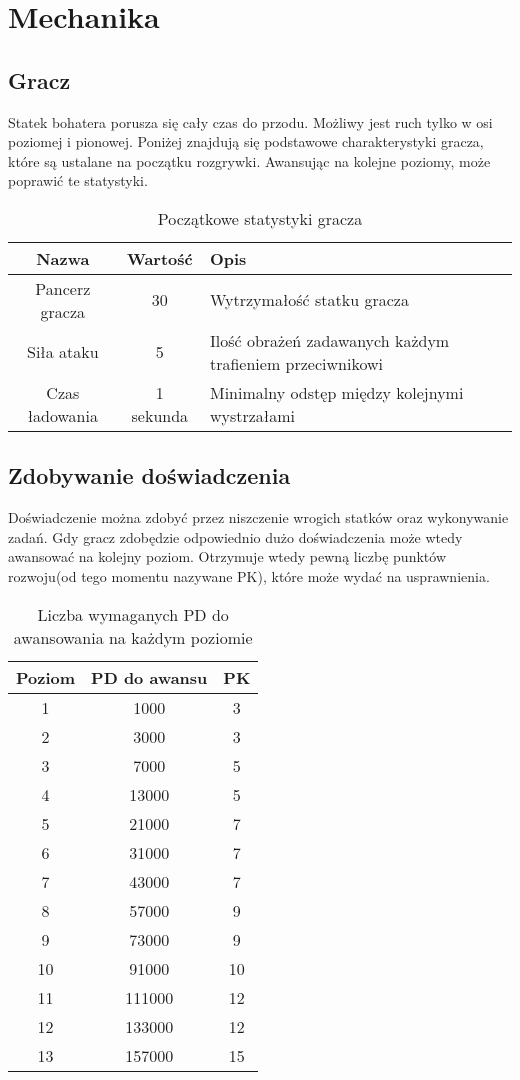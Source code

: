 \chapter{Mechanika}

\section{Gracz}
Statek bohatera porusza się cały czas do przodu. Możliwy jest ruch tylko w osi poziomej i pionowej.
Poniżej znajdują się podstawowe charakterystyki gracza, które są ustalane na początku rozgrywki. Awansując na kolejne poziomy, może poprawić te statystyki.

\begin{table}[h]
\centering
\begin{tabular}{ | c | c | p{6cm} | }
\hline
\textbf{Nazwa} & \textbf{Wartość} & \textbf{Opis} \\ \hline
Pancerz gracza & 30 & Wytrzymałość statku gracza \\ \hline
Siła ataku & 5 & Ilość obrażeń zadawanych każdym trafieniem przeciwnikowi\\ \hline
Czas ładowania & 1 sekunda & Minimalny odstęp między kolejnymi wystrzałami\\ \hline
\end{tabular}
\caption{Początkowe statystyki gracza}
\end{table}

\section{Zdobywanie doświadczenia}
Doświadczenie można zdobyć przez niszczenie wrogich statków oraz wykonywanie zadań. Gdy gracz zdobędzie odpowiednio dużo doświadczenia może wtedy awansować na kolejny poziom. Otrzymuje wtedy pewną liczbę punktów rozwoju(od tego momentu nazywane PK), które może wydać na usprawnienia.

\begin{table}[h]
\centering
\begin{tabular}{ | c | c | c | }
\hline
\textbf{Poziom} & \textbf{PD do awansu} & \textbf{PK} \\
\hline
1 & 1000 & 3 \\
2 & 3000 & 3 \\
3 & 7000 & 5 \\
4 & 13000 & 5 \\
5 & 21000 & 7 \\
6 & 31000 & 7 \\
7 & 43000 & 7 \\
8 & 57000 & 9 \\
9 & 73000 & 9 \\
10 & 91000 & 10 \\
11 & 111000 & 12 \\
12 & 133000 & 12 \\
13 & 157000 & 15 \\
\hline

\end{tabular}
\caption{Liczba wymaganych PD do awansowania na każdym poziomie}
\end{table}

